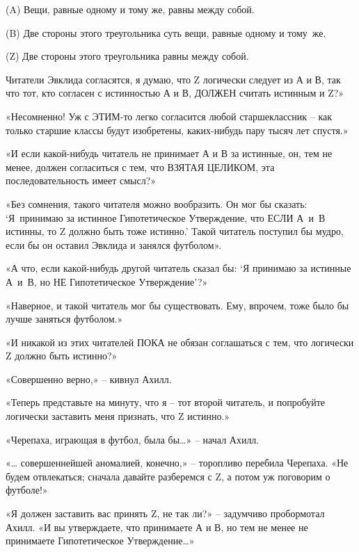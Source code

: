 \documentclass[../main.tex]{subfiles}
\begin{document}
\begin{Dialogue}
\begin{statements}
    \item[(A)] Вещи, равные одному и тому же, равны между собой.
    \item[(B)] Две стороны этого треугольника суть вещи, равные одному и тому~же.
    \item[(Z)] Две стороны этого треугольника равны между собой.
\end{statements}

Читатели Эвклида согласятся, я думаю, что Z логически следует из А и В, так что тот, кто согласен с истинностью А и В, ДОЛЖЕН считать истинным и Z?»

«Несомненно! Уж с ЭТИМ-то легко согласится любой старшеклассник \--- как только старшие классы будут изобретены, каких-нибудь пару тысяч лет спустя.»

«И если какой-нибудь читатель не принимает А и В за истинные, он, тем не менее, должен согласиться с тем, что ВЗЯТАЯ ЦЕЛИКОМ, эта последовательность имеет смысл?»

«Без сомнения, такого читателя можно вообразить. Он мог бы сказать: \enquote*{Я~принимаю за истинное Гипотетическое Утверждение, что ЕСЛИ А~и~В истинны, то Z должно быть тоже истинно.} Такой читатель поступил бы мудро, если бы он оставил Эвклида и занялся футболом».

«А что, если какой-нибудь другой читатель сказал бы: \enquote*{Я принимаю за истинные А~и~В, но НЕ Гипотетическое Утверждение}?»

«Наверное, и такой читатель мог бы существовать. Ему, впрочем, тоже было бы лучше заняться футболом.»

«И никакой из этих читателей ПОКА не обязан соглашаться с тем, что логически Z должно быть истинно?»

«Совершенно верно,» \--- кивнул Ахилл.

«Теперь представьте на минуту, что я \--- тот второй читатель, и попробуйте логически заставить меня признать, что Z истинно.»

«Черепаха, играющая в футбол, была бы\ldots» \--- начал Ахилл.

«\ldots{} совершеннейшей аномалией, конечно,» \--- торопливо перебила Черепаха. «Не будем отвлекаться; сначала давайте разберемся с Z, а потом уж поговорим о футболе!»

«Я должен заставить вас принять Z, не так ли?» \--- задумчиво пробормотал Ахилл. «И вы утверждаете, что принимаете А и В, но тем не менее не принимаете Гипотетическое Утверждение\ldots»


\end{Dialogue}
\end{document}
